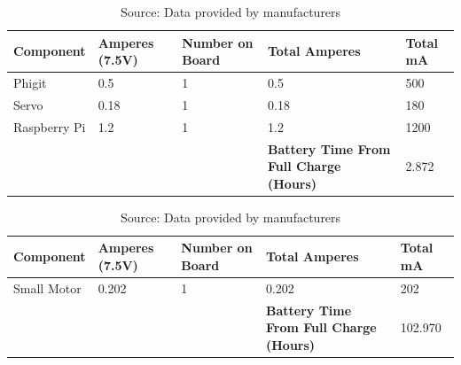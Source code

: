 \documentclass[a4paper]{article}
\begin{document}
\begin{center}
\begin{table}[!htb]
\centering
\begin{tabular}{| p{2cm} | p{2cm} | p{2cm} | p{2cm} | p{2cm} |}
\hline
\textbf{Component} & \textbf{Amperes (7.5V)} & \textbf{Number on Board} & \textbf{Total Amperes} & \textbf{Total mA}\\
\hline
Phigit & 0.5 & 1 & 0.5 & 500 \\
\hline
Servo & 0.18 & 1 & 0.18 & 180 \\
\hline 
Raspberry Pi & 1.2 & 1 & 1.2 & 1200 \\
\hline
 & & & \textbf{Battery Time From Full Charge (Hours)} & 2.872 \\ 
 \hline
\end{tabular}
\caption{Source: Data provided by manufacturers}
\end{table}

\begin{table}[!htb]
\centering
\begin{tabular}{| p{2cm} | p{2cm} | p{2cm} | p{2cm} | p{2cm} |}
\hline
\textbf{Component} & \textbf{Amperes (7.5V)} & \textbf{Number on Board} & \textbf{Total Amperes} & \textbf{Total mA}\\
\hline
Small Motor & 0.202 & 1 & 0.202 & 202 \\
\hline
 & & & \textbf{Battery Time From Full Charge (Hours)} & 102.970\\ 
 \hline
\end{tabular}
\caption{Source: Data provided by manufacturers}
\end{table}

\end{center}
  
\end{document}
